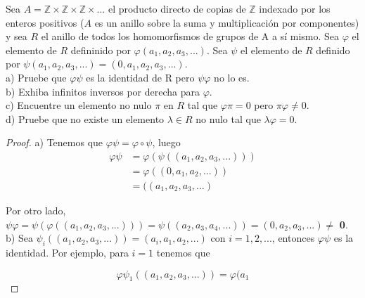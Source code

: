 \begin{problem}[30] 
Sea $A = \mathbb{Z} \times \mathbb{Z} \times \mathbb{Z} \times ...$ el producto directo de copias de $\mathbb{Z}$ indexado por los enteros positivos ($A$ es un anillo sobre la suma y multiplicación por componentes) y sea $R$ el anillo de todos los homomorfismos de grupos de A a sí mismo. Sea $\varphi$ el elemento de $R$ defininido por $\varphi(a_{1},a_{2},a_{3},...)$. Sea $\psi$ el elemento de $R$ definido por $\psi (a_{1},a_{2},a_{3},...) = (0, a_{1}, a_{2}, a_{3},...)$.\\

a) Pruebe que $\varphi \psi$ es la identidad de R pero $\psi \varphi$ no lo es.\\
b) Exhiba infinitos inversos por derecha para $\varphi$.\\
c) Encuentre un elemento no nulo $\pi$ en $R$ tal que $\varphi \pi = 0$ pero $\pi \varphi \neq 0 $.\\
d) Pruebe que no existe un elemento $\lambda \in R$ no nulo tal que $\lambda \varphi = 0$.\\

\end{problem}

\begin{proof}
a) Tenemos que $\varphi \psi = \varphi \circ \psi$, luego\\
\begin{equation*}
\begin{split}
    \varphi \psi &= \varphi(\psi((a_{1},a_{2},a_{3},...)))\\
                 &= \varphi ((0,a_{1},a_{2},...))\\
                 &= ((a_{1},a_{2},a_{3},...)
\end{split}
\end{equation*}

\vpsace{3mm}

Por otro lado, $\psi \varphi = \psi(\varphi((a_{1},a_{2},a_{3},...))) = \psi((a_{2},a_{3},a_{4},...)) = (0,a_{2},a_{3},...) \neq $ \textbf{0}.\\

b) Sea $\psi_{i}((a_{1},a_{2},a_{3},...)) = (a_{i},a_{1},a_{2},...)$ con $i = 1,2,...$, entonces $\varphi \psi$ es la identidad. Por ejemplo, para $i = 1$ tenemos que 

\begin{equation*}
    \varphi \psi_{1}((a_{1},a_{2},a_{3},...)) = \varphi (a_1
\end{equation*}

\end{proof}